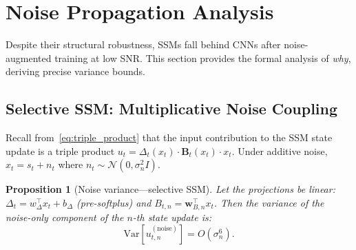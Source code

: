 \documentclass[journal]{IEEEtran}
\newtheorem{proposition}{Proposition}
\begin{document}
\section{Noise Propagation Analysis}
\label{sec:analysis}

Despite their structural robustness, SSMs fall behind CNNs after noise-augmented training at low SNR.
This section provides the formal analysis of \emph{why}, deriving precise variance bounds.

\subsection{Selective SSM: Multiplicative Noise Coupling}
\label{sec:mult_noise}

Recall from~\eqref{eq:triple_product} that the input contribution to the SSM state update is a triple product $u_t = \Delta_t(x_t) \cdot \mathbf{B}_t(x_t) \cdot x_t$.
Under additive noise, $x_t = s_t + n_t$ where $n_t \sim \mathcal{N}(0, \sigma_n^2 I)$.

\begin{proposition}[Noise variance---selective SSM]
\label{prop:var_ssm}
Let the projections be linear: $\Delta_t = w_\Delta^\top x_t + b_\Delta$ (pre-softplus) and $B_{t,n} = \mathbf{w}_{B,n}^\top x_t$.
Then the variance of the noise-only component of the $n$-th state update is:
\begin{equation}
\mathrm{Var}[u_{t,n}^{(\text{noise})}] = O(\sigma_n^6).
\label{eq:var_ssm}
\end{equation}
\end{proposition}
\end{document}
